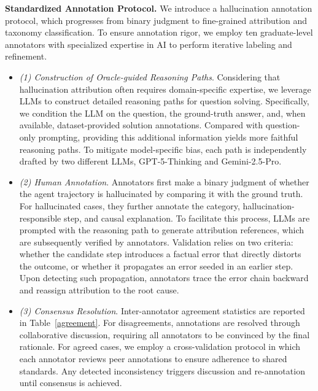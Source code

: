 \noindent\textbf{Standardized Annotation Protocol.}
We introduce a hallucination annotation protocol, which progresses from binary judgment to fine-grained attribution and taxonomy classification. To ensure annotation rigor, we employ ten graduate-level annotators with specialized expertise in AI to perform iterative labeling and refinement.
\begin{itemize}[noitemsep,left=2pt, itemsep=0pt, topsep=0pt]
    \item \textit{(1) Construction of Oracle-guided Reasoning Paths}. Considering that hallucination attribution often requires domain-specific expertise, we leverage LLMs to 
    construct detailed reasoning paths for question solving. Specifically, we condition the LLM on the question, the ground-truth answer, and, when available, dataset-provided solution annotations. Compared with question-only prompting, providing this additional information yields more faithful reasoning paths. To mitigate model-specific bias, each path is independently drafted by two different LLMs, GPT-5-Thinking and Gemini-2.5-Pro.   
    \item \textit{(2) Human Annotation}. Annotators first make a binary judgment of whether the agent trajectory is hallucinated by comparing it with the ground truth. For hallucinated cases, they further annotate the category, hallucination-responsible step, and causal explanation. To facilitate this process, LLMs are prompted with the reasoning path to generate attribution references, which are subsequently verified by annotators. Validation relies on two criteria: whether the candidate step introduces a factual error that directly distorts the outcome, or whether it propagates an error seeded in an earlier step. Upon detecting such propagation, annotators trace the error chain backward and reassign attribution to the root cause.
    \item \textit{(3) Consensus Resolution}. Inter-annotator agreement statistics are reported in Table~\ref{agreement}. For disagreements, annotations are resolved through collaborative discussion, requiring all annotators to be convinced by the final rationale. For agreed cases, we employ a cross-validation protocol in which each annotator reviews peer annotations to ensure adherence to shared standards. Any detected inconsistency triggers discussion and re-annotation until consensus is achieved.    
\end{itemize}






